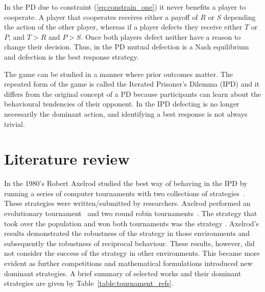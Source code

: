 In the PD due to constraint (\ref{eq:constrain_one}) it never benefits a player
to cooperate. A player that cooperates receives either a payoff of \(R\) or \(S\)
depending the action of the other player, whereas if a player defects they
receive either \(T\) or \(P\), and \(T > R\) and \(P > S\). Once both
players defect neither have a reason to change their decision. Thus, in the
PD mutual defection is a Nash equilibrium and defection is the
best response strategy.

The game can be studied in a manner where prior outcomes matter. The repeated
form of the game is called the Iterated Prisoner's Dilemma (IPD) and it differs
from the original concept of a PD because participants can learn about the
behavioural tendencies of their opponent. In the IPD defecting is no
longer necessarily the dominant action, and identifying a best response is not
always trivial.

\section{Literature review}\label{section:introduction_brief_literature}

In the 1980's Robert Axelrod studied the best way of behaving in the IPD by
running a series of computer tournaments with two collections of
strategies~\cite{Axelrod1984}. These strategies were written/submitted by
researchers. Axelrod performed an evolutionary tournament~\cite{Axelrod1981} and
two round robin tournaments~\cite{Axelrod1980a, Axelrod1980b}. The strategy that
took over the population and won both tournaments was the strategy \TitForTat.
Axelrod's results demonstrated the robustness of the strategy in those
environments and subsequently the robustness of reciprocal behaviour. These
results, however, did not consider the success of the strategy in other
environments. This became more evident as further competitions and mathematical
formulations introduced new dominant strategies. A
brief summary of selected works and their dominant strategies are given by
Table~\ref{table:tournament_refs}.

